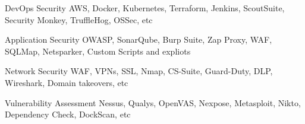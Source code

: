 

\begin{cvskills}

  \cvskill
    {DevOps Security} %
    {AWS, Docker, Kubernetes, Terraform, Jenkins, ScoutSuite, Security Monkey, TruffleHog, OSSec, etc} %

  \cvskill
    {Application Security} %
    {OWASP, SonarQube, Burp Suite, Zap Proxy, WAF, SQLMap, Netsparker, Custom Scripts and expliots } %

  \cvskill
    {Network Security} %
    {WAF, VPNs, SSL, Nmap, CS-Suite, Guard-Duty, DLP, Wireshark, Domain takeovers, etc } %

  \cvskill
    {Vulnerability Assessment } %
    {Nessus, Qualys, OpenVAS, Nexpose, Metasploit, Nikto, Dependency Check, DockScan, etc } %

\end{cvskills}
